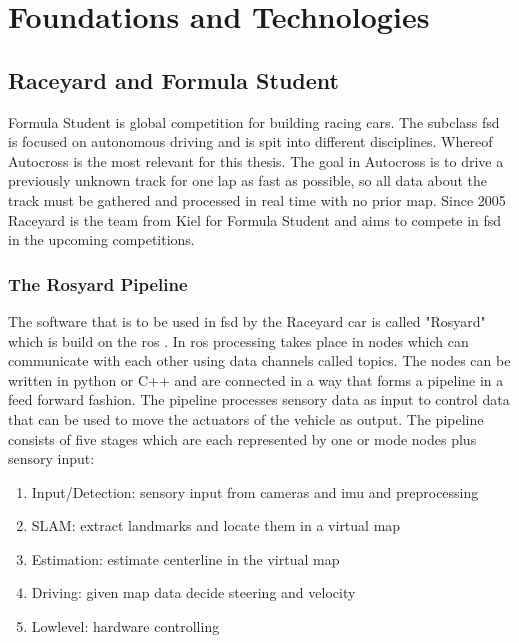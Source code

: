 

\graphicspath{{Chapter/Figs/FoundationsAndTechnologies/}}
\chapter{Foundations and Technologies}

\section{Raceyard and Formula Student}
Formula Student is global competition for building racing cars. The subclass \ac{fsd} is focused on autonomous driving and is spit into different disciplines. Whereof Autocross is the most relevant for this thesis. The goal in Autocross is to drive a previously unknown track for one lap as fast as possible, so all data about the track must be gathered and processed in real time with no prior map.
Since 2005 Raceyard is the team from Kiel for Formula Student and aims to compete in \ac{fsd} in the upcoming competitions.


\subsection{The Rosyard Pipeline}
The software that is to be used in \ac{fsd} by the Raceyard car is called "Rosyard" which is build on the \ac{ros} \cite{ros}.
In \ac{ros} processing takes place in nodes which can communicate with each other using data channels called topics. The nodes can be written in python or C++ and are connected in a way that forms a pipeline in a feed forward fashion. The pipeline processes sensory data as input to control data that can be used to move the actuators of the vehicle as output. The pipeline consists of five stages which are each represented by one or mode nodes plus sensory input:
\begin{enumerate}
    \item Input/Detection: sensory input from cameras and \ac{imu} and preprocessing
    \item SLAM: extract landmarks and locate them in a virtual map
    \item Estimation: estimate centerline in the virtual map
    \item Driving: given map data decide steering and velocity
    \item Lowlevel: hardware controlling
\end{enumerate}

